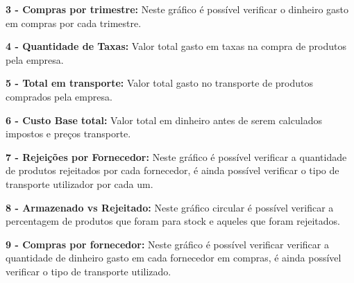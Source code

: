 \textbf{3 - Compras por trimestre:} Neste gráfico é possível verificar o dinheiro gasto em compras por cada trimestre.

\textbf{4 - Quantidade de Taxas:} Valor total gasto em taxas na compra de produtos pela empresa.

\textbf{5 - Total em transporte:} Valor total gasto no transporte de produtos comprados pela empresa.

\textbf{6 - Custo Base total:} Valor total em dinheiro antes de serem calculados impostos e preços transporte.

\textbf{7 - Rejeições por Fornecedor:} Neste gráfico é possível verificar a quantidade de produtos rejeitados por cada fornecedor, é ainda possível verificar o tipo de transporte utilizador por cada um.

\textbf{8 - Armazenado vs Rejeitado:} Neste gráfico circular é possível verificar a percentagem de produtos que foram para stock e aqueles que foram rejeitados.

\textbf{9 - Compras por fornecedor:} Neste gráfico é possível verificar verificar a quantidade de dinheiro gasto em cada fornecedor em compras, é ainda possível verificar o tipo de transporte utilizado.


